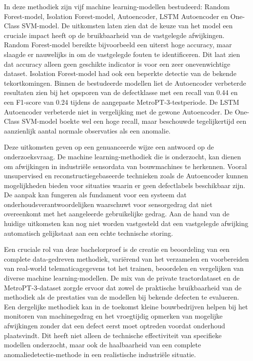 In deze methodiek zijn vijf machine learning-modellen bestudeerd: Random Forest-model, Isolation Forest-model, Autoencoder, LSTM Autoencoder en One-Class SVM-model. De uitkomsten laten zien dat de keuze van het model een cruciale impact heeft op de bruikbaarheid van de vastgelegde afwijkingen. Random Forest-model bereikte bijvoorbeeld een uiterst hoge accuracy, maar slaagde er nauwelijks in om de vastgelegde fouten te identificeren. Dit laat zien dat accuracy alleen geen geschikte indicator is voor een zeer onevenwichtige dataset. Isolation Forest-model had ook een beperkte detectie van de bekende tekortkomingen. Binnen de bestudeerde modellen liet de Autoencoder verbeterde resultaten zien bij het opsporen van de defectklasse met een recall van 0.44 en een F1-score van 0.24 tijdens de aangepaste MetroPT-3-testperiode. De LSTM Autoencoder verbeterde niet in vergelijking met de gewone Autoencoder. De One-Class SVM-model boekte wel een hoge recall, maar beschouwde tegelijkertijd een aanzienlijk aantal normale observaties als een anomalie.

Deze uitkomsten geven op een genuanceerde wijze een antwoord op de onderzoeksvraag. De machine learning-methodiek die is onderzocht, kan dienen om afwijkingen in industriële sensordata van bouwmachines te herkennen. Vooral unsupervised en reconstructiegebaseerde technieken zoals de Autoencoder kunnen mogelijkheden bieden voor situaties waarin er geen defectlabels beschikbaar zijn. De aanpak kan fungeren als fundament voor een systeem dat onderhoudsverantwoordelijken waarschuwt voor sensorgedrag dat niet overeenkomt met het aangeleerde gebruikelijke gedrag. Aan de hand van de huidige uitkomsten kan nog niet worden vastgesteld dat een vastgelegde afwijking automatisch gelijkstaat aan een echte technische storing.

Een cruciale rol van deze bachelorproef is de creatie en beoordeling van een complete data-gedreven methodiek, variërend van het verzamelen en voorbereiden van real-world telematicagegevens tot het trainen, beoordelen en vergelijken van diverse machine learning-modellen. De mix van de private tractordataset en de MetroPT-3-dataset zorgde ervoor dat zowel de praktische bruikbaarheid van de methodiek als de prestaties van de modellen bij bekende defecten te evalueren. Een dergelijke methodiek kan in de toekomst kleine bouwbedrijven helpen bij het monitoren van machinegedrag en het vroegtijdig opmerken van mogelijke afwijkingen zonder dat een defect eerst moet optreden voordat onderhoud plaatsvindt. Dit heeft niet alleen de technische effectiviteit van specifieke modellen onderzocht, maar ook de haalbaarheid van een complete anomaliedetectie-methode in een realistische industriële situatie.

